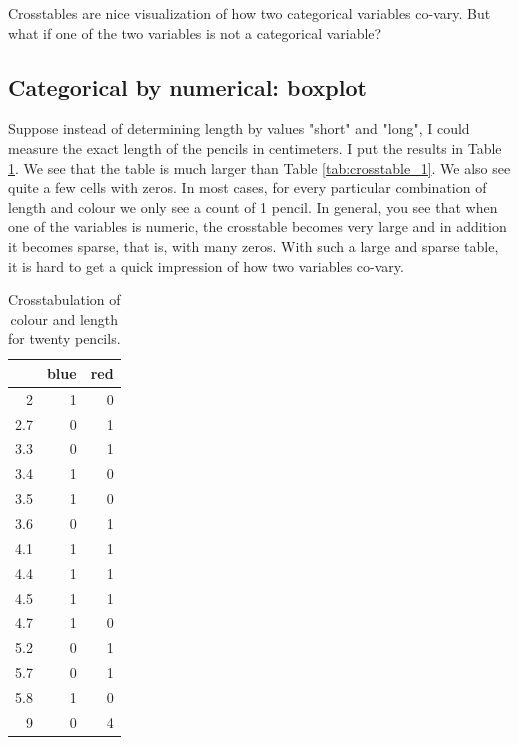 \documentclass[]{report}\usepackage[]{graphicx}\usepackage[]{color}
\begin{document}
Crosstables are nice visualization of how two categorical variables co-vary. But what if one of the two variables is not a categorical variable?


\subsection{Categorical by numerical: boxplot}
Suppose instead of determining length by values "short" and "long", I could measure the exact length of the pencils in centimeters. I put the results in Table \ref{tab:crosstable_2}. We see that the table is much larger than Table \ref{tab:crosstable_1}. We also see quite a few cells with zeros. In most cases, for every particular combination of length and colour we only see a count of 1 pencil. In general, you see that when one of the variables is numeric, the crosstable becomes very large and in addition it becomes sparse, that is, with many zeros. With such a large and sparse table, it is hard to get a quick impression of how two variables co-vary.

\begin{table}[ht]
\centering
\caption{Crosstabulation of colour and length for twenty pencils.} 
\label{tab:crosstable_2}
\begin{tabular}{rrr}
  \hline
 & blue & red \\ 
  \hline
2 &   1 &   0 \\ 
  2.7 &   0 &   1 \\ 
  3.3 &   0 &   1 \\ 
  3.4 &   1 &   0 \\ 
  3.5 &   1 &   0 \\ 
  3.6 &   0 &   1 \\ 
  4.1 &   1 &   1 \\ 
  4.4 &   1 &   1 \\ 
  4.5 &   1 &   1 \\ 
  4.7 &   1 &   0 \\ 
  5.2 &   0 &   1 \\ 
  5.7 &   0 &   1 \\ 
  5.8 &   1 &   0 \\ 
  9 &   0 &   4 \\ 
   \hline
\end{tabular}
\end{table}
\end{document}
